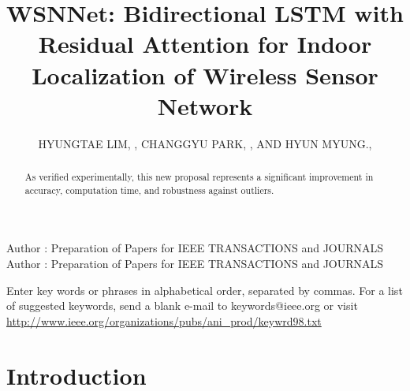 \documentclass{ieeeaccess}
\begin{document}

\title{WSNNet: Bidirectional LSTM with Residual Attention for Indoor Localization of Wireless Sensor Network}
\author{\uppercase{HYUNGTAE LIM}, ,
	\uppercase{CHANGGYU PARK}, ,
	\uppercase{ and Hyun Myung}.,
	}
\address[1]{Urban Robotics Laboratory, Korea Advanced Institute of Science and Technology, Daejeon 34141, South Korea.}


\markboth
{Author \headeretal: Preparation of Papers for IEEE TRANSACTIONS and JOURNALS}
{Author \headeretal: Preparation of Papers for IEEE TRANSACTIONS and JOURNALS}


\begin{abstract}
	

As verified experimentally, this new proposal represents a significant improvement in accuracy, computation time, and robustness against outliers.

\end{abstract}

\begin{keywords}
Enter key words or phrases in alphabetical 
order, separated by commas. For a list of suggested keywords, send a blank 
e-mail to keywords@ieee.org or visit \underline
{http://www.ieee.org/organizations/pubs/ani\_prod/keywrd98.txt}
\end{keywords}

\titlepgskip=-15pt

\maketitle

\section{Introduction}
\label{sec:introduction}
\end{document}
